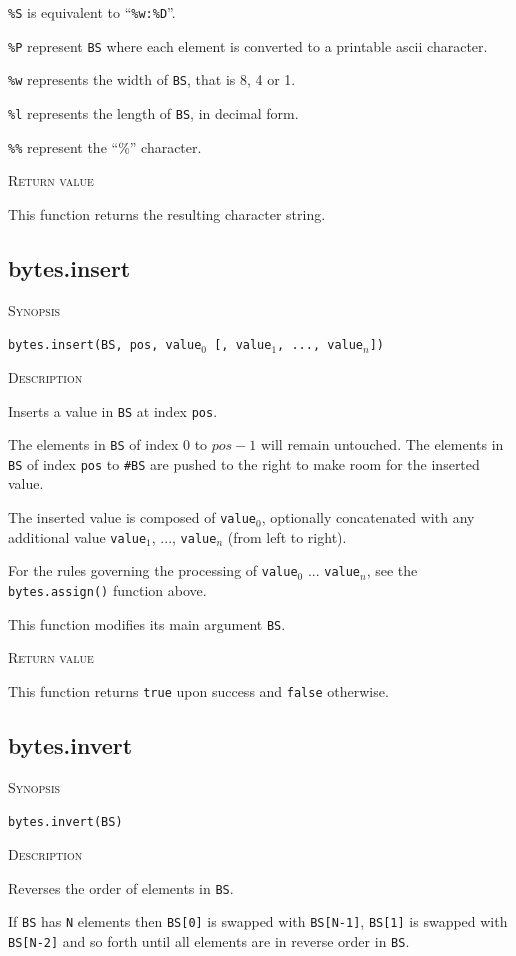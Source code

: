 \documentclass[11pt]{report}
\newcommand{\mansection}[1]{\vspace{0.5em}\par\noindent\textsc{#1}\vspace{0.5em}\par}
\newcommand{\syn}[1]{\texttt{#1}}
\begin{document}
  \syn{\%S} is equivalent to ``\syn{\%w:\%D}''.
  
  \syn{\%P} represent \syn{BS} where each element is converted to a printable ascii character.
  
  \syn{\%w} represents the width of \syn{BS}, that is 8, 4 or 1.
  
  \syn{\%l} represents the length of \syn{BS}, in decimal form.
  
  \syn{\%\%} represent the ``\%'' character.

\mansection{Return value}
  This function returns the resulting character string.

\subsection{bytes.insert}

\mansection{Synopsis}
\syn{bytes.insert(BS, pos, \syn{value$_0$} [, \syn{value$_1$}, ..., \syn{value$_n$}])}

\mansection{Description}
  Inserts a value in \syn{BS} at index \syn{pos}.

  The elements in \syn{BS} of index 0 to $pos-1$ will remain untouched.
  The elements in \syn{BS} of index \syn{pos} to \syn{\#BS} are pushed to the right
  to make room for the inserted value.

  The inserted value is composed of \syn{value$_0$}, optionally concatenated with
  any additional value \syn{value$_1$}, ..., \syn{value$_n$} (from left to right).

  For the rules governing the processing of \syn{value$_0$} ... \syn{value$_n$}, see
  the \syn{bytes.assign()} function above.

  This function modifies its main argument \syn{BS}.
  
\mansection{Return value}
  This function returns \syn{true} upon success and \syn{false} otherwise.

\subsection{bytes.invert}

\mansection{Synopsis}
\syn{bytes.invert(BS)}

\mansection{Description}
  Reverses the order of elements in \syn{BS}.

  If \syn{BS} has \syn{N} elements then \syn{BS[0]} is swapped with \syn{BS[N-1]},
  \syn{BS[1]} is swapped with \syn{BS[N-2]} and so forth until all elements are
  in reverse order in \syn{BS}.
\end{document}
